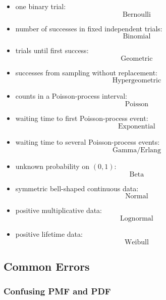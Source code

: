 \begin{itemize}
    \item one binary trial:
    \[
    \boxed{
    \text{Bernoulli}
    }
    \]

    \item number of successes in fixed independent trials:
    \[
    \boxed{
    \text{Binomial}
    }
    \]

    \item trials until first success:
    \[
    \boxed{
    \text{Geometric}
    }
    \]

    \item successes from sampling without replacement:
    \[
    \boxed{
    \text{Hypergeometric}
    }
    \]

    \item counts in a Poisson-process interval:
    \[
    \boxed{
    \text{Poisson}
    }
    \]

    \item waiting time to first Poisson-process event:
    \[
    \boxed{
    \text{Exponential}
    }
    \]

    \item waiting time to several Poisson-process events:
    \[
    \boxed{
    \text{Gamma/Erlang}
    }
    \]

    \item unknown probability on \((0,1)\):
    \[
    \boxed{
    \text{Beta}
    }
    \]

    \item symmetric bell-shaped continuous data:
    \[
    \boxed{
    \text{Normal}
    }
    \]

    \item positive multiplicative data:
    \[
    \boxed{
    \text{Lognormal}
    }
    \]

    \item positive lifetime data:
    \[
    \boxed{
    \text{Weibull}
    }
    \]
\end{itemize}

\subsection{Common Errors}
\label{subsec:probability-distribution-common-errors}

\subsubsection{Confusing PMF and PDF}

